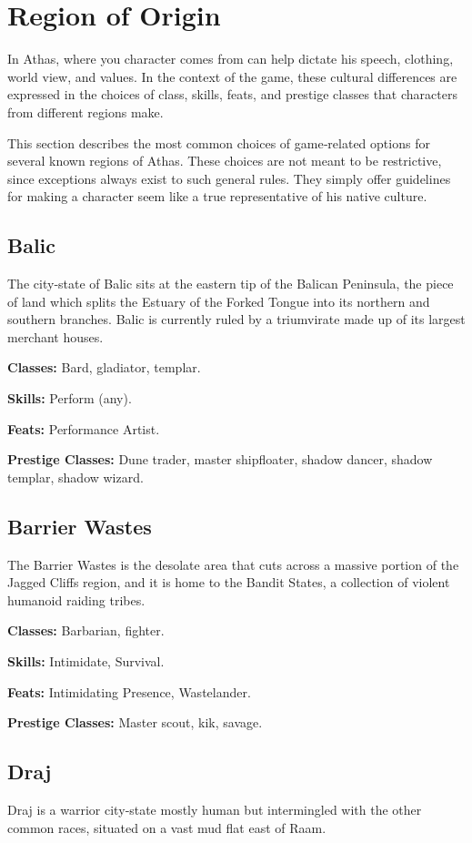 \section{Region of Origin}

In Athas, where you character comes from can help dictate his speech, clothing, world view, and values. In the context of the game, these cultural differences are expressed in the choices of class, skills, feats, and prestige classes that characters from different regions make.

This section describes the most common choices of game‐related options for several known regions of Athas. These choices are not meant to be restrictive, since exceptions always exist to such general rules. They simply offer guidelines for making a character seem like a true representative of his native culture.

\subsection{Balic}
The city‐state of Balic sits at the eastern tip of the Balican Peninsula, the piece of land which splits the Estuary of the Forked Tongue into its northern and southern branches. Balic is currently ruled by a triumvirate made up of its largest merchant houses.

\textbf{Classes:} Bard, gladiator, templar.

\textbf{Skills:} Perform (any).

\textbf{Feats:} Performance Artist.

\textbf{Prestige Classes:} Dune trader, master shipfloater, shadow dancer, shadow templar, shadow wizard.

\subsection{Barrier Wastes}
The Barrier Wastes is the desolate area that cuts across a massive portion of the Jagged Cliffs region, and it is home to the Bandit States, a collection of violent humanoid raiding tribes.

\textbf{Classes:} Barbarian, fighter.

\textbf{Skills:} Intimidate, Survival.

\textbf{Feats:} Intimidating Presence, Wastelander.

\textbf{Prestige Classes:} Master scout, kik, savage.

\subsection{Draj}
Draj is a warrior city‐state mostly human but intermingled with the other common races, situated on a vast mud flat east of Raam.

